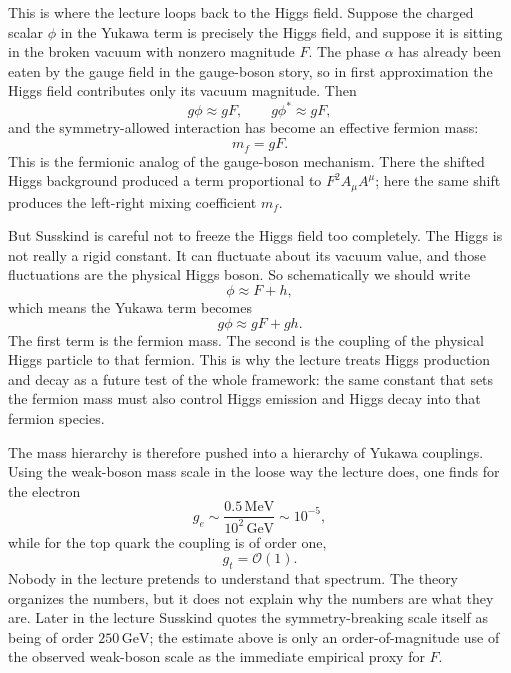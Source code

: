 This is where the lecture loops back to the Higgs field. Suppose the charged scalar \(\phi\) in the Yukawa term is precisely the Higgs field, and suppose it is sitting in the broken vacuum with nonzero magnitude \(F\). The phase \(\alpha\) has already been eaten by the gauge field in the gauge-boson story, so in first approximation the Higgs field contributes only its vacuum magnitude. Then
\begin{equation}
g\phi \approx gF,
\qquad
g\phi^* \approx gF,
\end{equation}
and the symmetry-allowed interaction has become an effective fermion mass:
\begin{equation}
m_f=gF.
\end{equation}
This is the fermionic analog of the gauge-boson mechanism. There the shifted Higgs background produced a term proportional to \(F^2A_\mu A^\mu\); here the same shift produces the left-right mixing coefficient \(m_f\).

But Susskind is careful not to freeze the Higgs field too completely. The Higgs is not really a rigid constant. It can fluctuate about its vacuum value, and those fluctuations are the physical Higgs boson. So schematically we should write
\begin{equation}
\phi \approx F+h,
\end{equation}
which means the Yukawa term becomes
\begin{equation}
g\phi \approx gF+gh.
\end{equation}
The first term is the fermion mass. The second is the coupling of the physical Higgs particle to that fermion. This is why the lecture treats Higgs production and decay as a future test of the whole framework: the same constant that sets the fermion mass must also control Higgs emission and Higgs decay into that fermion species.

The mass hierarchy is therefore pushed into a hierarchy of Yukawa couplings. Using the weak-boson mass scale in the loose way the lecture does, one finds for the electron
\begin{equation}
g_e \sim \frac{0.5\,\mathrm{MeV}}{10^2\,\mathrm{GeV}} \sim 10^{-5},
\end{equation}
while for the top quark the coupling is of order one,
\begin{equation}
g_t=\mathcal{O}(1).
\end{equation}
Nobody in the lecture pretends to understand that spectrum. The theory organizes the numbers, but it does not explain why the numbers are what they are. Later in the lecture Susskind quotes the symmetry-breaking scale itself as being of order \(250\,\mathrm{GeV}\); the estimate above is only an order-of-magnitude use of the observed weak-boson scale as the immediate empirical proxy for \(F\).

